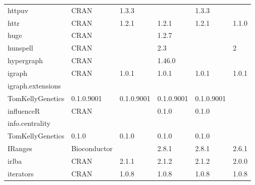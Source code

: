 \begin{longtable}{llllll}
\rowcolor{black!5}
httpuv                        & \acrshort{CRAN}                      & 1.3.3       &             & 1.3.3          &                    \\
\rowcolor{black!10}
httr                          & \acrshort{CRAN}                      & 1.2.1       & 1.2.1       & 1.2.1          & 1.1.0             \\
\rowcolor{black!5}
huge                          & \acrshort{CRAN}                      &             & 1.2.7       &                &                    \\
\rowcolor{black!10}
hunspell                      & \acrshort{CRAN}                      &             & 2.3         &                & 2                 \\
\rowcolor{black!5}
hypergraph                    & \acrshort{CRAN}                      &             & 1.46.0      &                &                    \\
\rowcolor{black!10}
igraph                        & \acrshort{CRAN}                      & 1.0.1       & 1.0.1       & 1.0.1          & 1.0.1             \\
\rowcolor{black!5}
igraph.extensions             & \begin{tabular}[c]{@{}l@{}}GitHub \\ TomKellyGenetics \end{tabular}  & 0.1.0.9001  & 0.1.0.9001  & 0.1.0.9001     & 0.1.0.9001         \\
\rowcolor{black!10}
influenceR                    & \acrshort{CRAN}                      &             & 0.1.0       & 0.1.0          &                   \\
\rowcolor{black!5}
info.centrality               & \begin{tabular}[c]{@{}l@{}}GitHub \\ TomKellyGenetics \end{tabular}  & 0.1.0       & 0.1.0       & 0.1.0          & 0.1.0              \\
\rowcolor{black!10}
IRanges                       & Bioconductor              &             & 2.8.1       & 2.8.1          & 2.6.1             \\
\rowcolor{black!5}
irlba                         & \acrshort{CRAN}                      & 2.1.1       & 2.1.2       & 2.1.2          & 2.0.0              \\
\rowcolor{black!10}
iterators                     & \acrshort{CRAN}                      & 1.0.8       & 1.0.8       & 1.0.8          & 1.0.8             \\

\end{longtable}
